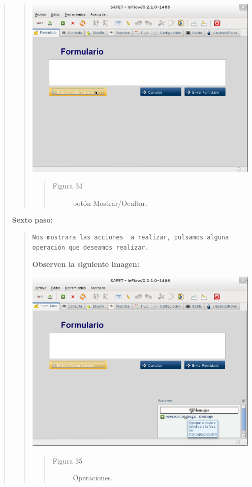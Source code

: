\documentclass[letterpaper,11pt,spanish]{sphinxmanual}
\begin{document}
\begin{quote}
\begin{quote}
\includegraphics{inflow9.png}
\begin{quote}\begin{description}
\item[{Figura 34}] \leavevmode
botón Mostrar/Ocultar.

\end{description}\end{quote}
\end{quote}

\textbf{Sexto paso:}
\begin{quote}

\begin{Verbatim}[commandchars=\\\{\}]
Nos mostrara las acciones  a realizar, pulsamos alguna operación que deseamos realizar.
\end{Verbatim}

\textbf{Observen la siguiente imagen:}

\includegraphics{inflow10.png}
\begin{quote}\begin{description}
\item[{Figura 35}] \leavevmode
Operaciones.


\end{description}
\end{quote}
\end{quote}
\end{quote}
\end{document}
